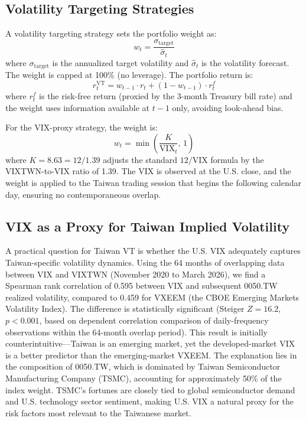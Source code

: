 \subsection{Volatility Targeting Strategies}

A volatility targeting strategy sets the portfolio weight as:
\begin{equation}
w_t = \frac{\sigma_{\text{target}}}{\hat{\sigma}_t}
\label{eq:vt}
\end{equation}
where $\sigma_{\text{target}}$ is the annualized target volatility and $\hat{\sigma}_t$ is the volatility forecast. The weight is capped at 100\% (no leverage). The portfolio return is:
\begin{equation}
r_t^{\text{VT}} = w_{t-1} \cdot r_t + (1 - w_{t-1}) \cdot r_t^{f}
\label{eq:vt_return}
\end{equation}
where $r_t^{f}$ is the risk-free return (proxied by the 3-month Treasury bill rate) and the weight uses information available at $t-1$ only, avoiding look-ahead bias.

For the VIX-proxy strategy, the weight is:
\begin{equation}
w_t = \min\!\left(\frac{K}{\text{VIX}_t}, \, 1\right)
\label{eq:vix_vt}
\end{equation}
where $K = 8.63 = 12 / 1.39$ adjusts the standard $12/\text{VIX}$ formula \citep{bozovic2024} by the VIXTWN-to-VIX ratio of 1.39. The VIX is observed at the U.S. close, and the weight is applied to the Taiwan trading session that begins the following calendar day, ensuring no contemporaneous overlap.

\subsection{VIX as a Proxy for Taiwan Implied Volatility}

A practical question for Taiwan VT is whether the U.S. VIX adequately captures Taiwan-specific volatility dynamics. Using the 64 months of overlapping data between VIX and VIXTWN (November 2020 to March 2026), we find a Spearman rank correlation of 0.595 between VIX and subsequent 0050.TW realized volatility, compared to 0.459 for VXEEM (the CBOE Emerging Markets Volatility Index). The difference is statistically significant (Steiger $Z = 16.2$, $p < 0.001$, based on dependent correlation comparison of daily-frequency observations within the 64-month overlap period). This result is initially counterintuitive---Taiwan is an emerging market, yet the developed-market VIX is a better predictor than the emerging-market VXEEM. The explanation lies in the composition of 0050.TW, which is dominated by Taiwan Semiconductor Manufacturing Company (TSMC), accounting for approximately 50\% of the index weight. TSMC's fortunes are closely tied to global semiconductor demand and U.S. technology sector sentiment, making U.S. VIX a natural proxy for the risk factors most relevant to the Taiwanese market.

